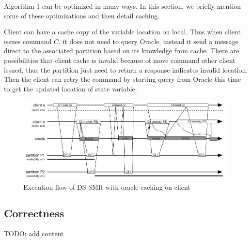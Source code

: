 Algorithm 1 can be optimized in many ways. In this section, we briefly mention some of these optimizations and then detail caching.

Client can have a cache copy of the variable location on local. Thus when client issues command $C$, it does not need to query Oracle, instead it send a message direct to the associated partition based on its knowledge from cache. There are possibilities that client cache is invalid because of move command other client issued, thus the partition just need to return a response indicates invalid location. Then the client can retry the command by starting query from Oracle this time to get the updated location of state variable. 

\begin{figure}
\begin{minipage}[b]{1\linewidth} %
\centering
      \includegraphics[width=0.85\linewidth]{figures/cache}
\end{minipage}
\caption{Execution flow of DS-SMR with oracle caching on client}
\label{fig:cache}
\end{figure}

\subsection{Correctness}
\label{sec:correctness}
TODO: add content